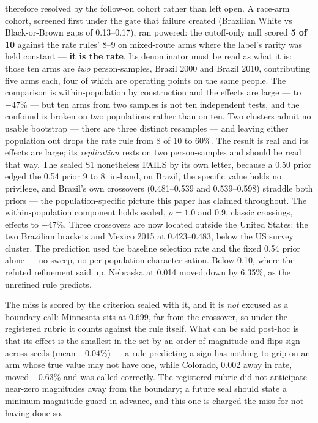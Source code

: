 \documentclass[9pt,conference]{IEEEtran}
\begin{document}
therefore resolved by the follow-on cohort rather than left open. A race-arm cohort,
screened first under the gate that failure created (Brazilian White vs Black-or-Brown
gaps of 0.13--0.17), ran powered: the cutoff-only null scored \textbf{5 of 10}
against the rate rules' 8--9 on mixed-route arms where the label's rarity was held
constant --- \textbf{it is the rate}. Its denominator must be read as what it is: those
ten arms are \emph{two} person-samples, Brazil 2000 and Brazil 2010, contributing five
arms each, four of which are operating points on the same people. The comparison is
within-population by construction and the effects are large --- to $-47\%$ --- but ten
arms from two samples is not ten independent tests, and the confound is broken on two
populations rather than on ten. Two clusters admit no usable bootstrap --- there are three
distinct resamples --- and leaving either population out drops the rate rule from 8 of 10
to 60\%. The result is real and its effects are large; its \emph{replication} rests on two
person-samples and should be read that way. The sealed S1 nonetheless FAILS by its own
letter, because a 0.50 prior edged the 0.54 prior 9 to 8: in-band, on Brazil, the
specific value holds no privilege, and Brazil's own crossovers (0.481--0.539 and
0.539--0.598) straddle both priors --- the population-specific picture this paper has
claimed throughout. The within-population component holds sealed, $\rho = 1.0$ and
$0.9$, classic crossings, effects to $-47\%$. Three crossovers are now located
outside the United States: the two Brazilian brackets and Mexico 2015 at
0.423--0.483, below the US survey cluster. The prediction used
the baseline selection rate and the fixed 0.54 prior alone --- no sweep, no per-population
characterisation. Below 0.10, where the refuted refinement said up, Nebraska at 0.014 moved
down by 6.35\%, as the unrefined rule predicts.

The miss is scored by the criterion sealed with it, and it is \emph{not} excused as a boundary
call: Minnesota sits at 0.699, far from the crossover, so under the registered rubric it
counts against the rule itself. What can be said post-hoc is that its effect is the smallest
in the set by an order of magnitude and flips sign across seeds (mean $-0.04\%$) --- a rule
predicting a sign has nothing to grip on an arm whose true value may not have one, while
Colorado, 0.002 away in rate, moved $+0.63\%$ and was called correctly. The registered rubric
did not anticipate near-zero magnitudes away from the boundary; a future seal should state a
minimum-magnitude guard in advance, and this one is charged the miss for not having done so.
\end{document}
